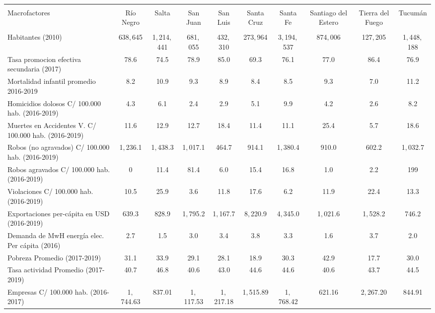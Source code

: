 \documentclass[12pt,a4paper]{article}
\begin{document}
\begin{table} \centering \tiny
 \centering 
  \caption{} 
  \label{} 
\begin{tabular}{@{\extracolsep{5pt}} lccccccccc} 
\\[-1.8ex]\hline 
\hline \\[-1.8ex] 
Macrofactores & Río Negro & Salta & San Juan & San Luis & Santa Cruz & Santa Fe & Santiago del Estero & Tierra del Fuego & Tucumán \\ 
\hline \\[-1.8ex] 
Habitantes (2010) &   638$,$645 &  1$,$214$,$441 &   681$,$055 &   432$,$310 &   273$,$964 &  3$,$194$,$537 &   874$,$006 &   127$,$205 &  1$,$448$,$188 \\ 
Tasa promocion efectiva secundaria (2017) & 78.6 & 74.5 & 78.9 & 85.0 & 69.3 & 76.1 & 77.0 & 86.4 & 76.9 \\ 
Mortalidad infantil promedio 2016-2019 &  8.2 & 10.9 &  9.3 &  8.9 &  8.4 &  8.5 &  9.3 &  7.0 & 11.2 \\ 
Homicidios dolosos C/ 100.000 hab. (2016-2019) & 4.3 & 6.1 & 2.4 & 2.9 & 5.1 & 9.9 & 4.2 & 2.6 & 8.2 \\ 
Muertes en Accidentes V. C/ 100.000  hab.  (2016-2019) & 11.6 & 12.9 & 12.7 & 18.4 & 11.4 & 11.1 & 25.4 &  5.7 & 18.6 \\ 
Robos (no agravados) C/ 100.000 hab. (2016-2019) & 1$,$236.1 & 1$,$438.3 & 1$,$017.1 &  464.7 &  914.1 & 1$,$380.4 &  910.0 &  602.2 & 1$,$032.7 \\ 
Robos agravados C/ 100.000 hab. (2016-2019) &   0 &  11.4 &  81.4 &   6.0 &  15.4 &  16.8 &   1.0 &   2.2 & 199 \\ 
Violaciones  C/ 100.000 hab. (2016-2019) & 10.5 & 25.9 &  3.6 & 11.8 & 17.6 &  6.2 & 11.9 & 22.4 & 13.3 \\ 
Exportaciones per-cápita en USD (2016-2019) &  639.3 &  828.9 & 1$,$795.2 & 1$,$167.7 & 8$,$220.9 & 4$,$345.0 & 1$,$021.6 & 1$,$528.2 &  746.2 \\ 
Demanda de MwH energía elec. Per cápita (2016) & 2.7 & 1.5 & 3.0 & 3.4 & 3.8 & 3.3 & 1.6 & 3.7 & 2.0 \\ 
Pobreza Promedio (2017-2019) & 31.1 & 33.9 & 29.1 & 28.1 & 18.9 & 30.3 & 42.9 & 17.7 & 30.0 \\ 
Tasa actividad Promedio (2017-2019) & 40.7 & 46.8 & 40.6 & 43.0 & 44.6 & 44.6 & 40.6 & 43.7 & 44.5 \\ 
Empresas  C/ 100.000 hab. (2016-2017) & 1$,$744.63 &  837.01 & 1$,$117.53 & 1$,$217.18 & 1$,$515.89 & 1$,$768.42 &  621.16 & 2$,$267.20 &  844.91 \\ 

\end{tabular}
\end{table}
\end{document}
